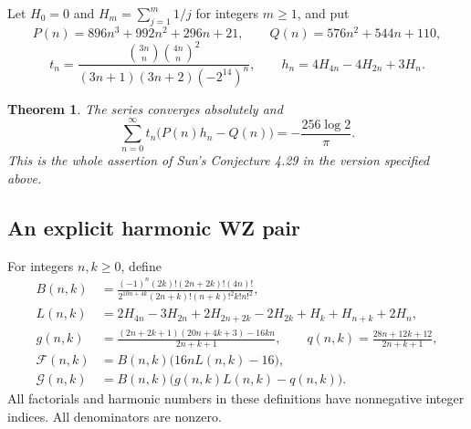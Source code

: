 \documentclass[11pt,a4paper]{article}
\newtheorem{theorem}{Theorem}[section]
\theoremstyle{remark}\newtheorem{remark}[theorem]{Remark}
\numberwithin{equation}{section}
\begin{document}
Let $H_0=0$ and $H_m=\sum_{j=1}^m1/j$ for integers $m\ge1$, and put
\[
 P(n)=896n^3+992n^2+296n+21,\qquad
 Q(n)=576n^2+544n+110,
\]
\[
 t_n=\frac{\binom{3n}{n}\binom{4n}{n}^{\!2}}
 {(3n+1)(3n+2)(-2^{14})^n},\qquad
 h_n=4H_{4n}-4H_{2n}+3H_n.
\]
\begin{theorem}\label{thm:sun429-complete}
The series converges absolutely and
\[
 \boxed{\displaystyle
 \sum_{n=0}^{\infty}t_n\bigl(P(n)h_n-Q(n)\bigr)
 =-\frac{256\log2}{\pi}.}
\]
This is the whole assertion of Sun's Conjecture 4.29 in the version
specified above.
\end{theorem}

\subsection{An explicit harmonic WZ pair}
For integers $n,k\ge0$, define
\begin{align}
 B(n,k)&=\frac{(-1)^n(2k)!(2n+2k)!(4n)!}
 {2^{10n+4k}(2n+k)!(n+k)!^2k!n!^2},\label{eq:s429-B}\\
 L(n,k)&=2H_{4n}-3H_{2n}+2H_{2n+2k}-2H_{2k}
       +H_k+H_{n+k}+2H_n,\label{eq:s429-L}\\
 g(n,k)&=\frac{(2n+2k+1)(20n+4k+3)-16kn}{2n+k+1},
 \qquad
 q(n,k)=\frac{28n+12k+12}{2n+k+1},\label{eq:s429-gq}\\
 \mathcal F(n,k)&=B(n,k)\bigl(16nL(n,k)-16\bigr),\label{eq:s429-F}\\
 \mathcal G(n,k)&=B(n,k)\bigl(g(n,k)L(n,k)-q(n,k)\bigr).
 \label{eq:s429-G}
\end{align}
All factorials and harmonic numbers in these definitions have
nonnegative integer indices. All denominators are nonzero.
\end{document}
